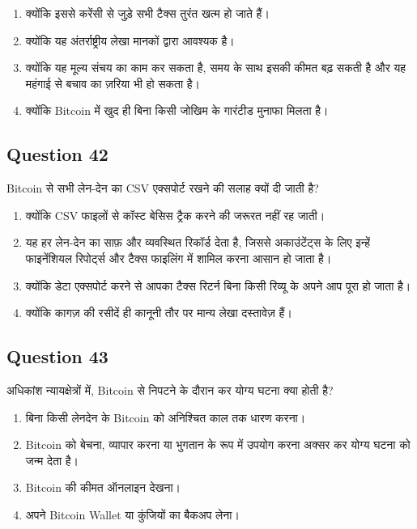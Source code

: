 \documentclass[12pt,a4paper]{article}
\begin{document}
\begin{enumerate}[label=\Alph*., leftmargin=*]
\item क्योंकि इससे करेंसी से जुड़े सभी टैक्स तुरंत खत्म हो जाते हैं।
\item क्योंकि यह अंतर्राष्ट्रीय लेखा मानकों द्वारा आवश्यक है।
\item क्योंकि यह मूल्य संचय का काम कर सकता है, समय के साथ इसकी कीमत बढ़ सकती है और यह महंगाई से बचाव का ज़रिया भी हो सकता है।
\item क्योंकि Bitcoin में खुद ही बिना किसी जोखिम के गारंटीड मुनाफा मिलता है।
\end{enumerate}

\bigskip


\subsection*{Question 42}
Bitcoin से सभी लेन-देन का CSV एक्सपोर्ट रखने की सलाह क्यों दी जाती है?

\begin{enumerate}[label=\Alph*., leftmargin=*]
\item क्योंकि CSV फाइलों से कॉस्ट बेसिस ट्रैक करने की जरूरत नहीं रह जाती।
\item यह हर लेन-देन का साफ़ और व्यवस्थित रिकॉर्ड देता है, जिससे अकाउंटेंट्स के लिए इन्हें फाइनेंशियल रिपोर्ट्स और टैक्स फाइलिंग में शामिल करना आसान हो जाता है।
\item क्योंकि डेटा एक्सपोर्ट करने से आपका टैक्स रिटर्न बिना किसी रिव्यू के अपने आप पूरा हो जाता है।
\item क्योंकि कागज़ की रसीदें ही कानूनी तौर पर मान्य लेखा दस्तावेज़ हैं।
\end{enumerate}

\bigskip


\subsection*{Question 43}
अधिकांश न्यायक्षेत्रों में, Bitcoin से निपटने के दौरान कर योग्य घटना क्या होती है?

\begin{enumerate}[label=\Alph*., leftmargin=*]
\item बिना किसी लेनदेन के Bitcoin को अनिश्चित काल तक धारण करना।
\item Bitcoin को बेचना, व्यापार करना या भुगतान के रूप में उपयोग करना अक्सर कर योग्य घटना को जन्म देता है।
\item Bitcoin की कीमत ऑनलाइन देखना।
\item अपने Bitcoin Wallet या कुंजियों का बैकअप लेना।
\end{enumerate}
\end{document}
